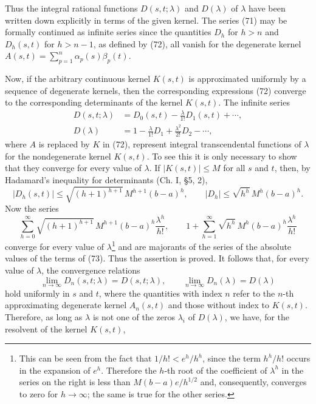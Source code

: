 Thus the integral rational functions $D(s,t;\lambda)$ and $D(\lambda)$ of $\lambda$ have been written down explicitly in terms of the given kernel. The series (71) may be formally continued as infinite series since the quantities $D_h$ for $h>n$ and $D_h(s,t)$ for $h>n-1$, as defined by (72), all vanish for the degenerate kernel $A(s,t)=\sum_{p=1}^{n}\alpha_p(s)\beta_p(t)$.

Now, if the arbitrary continuous kernel $K(s,t)$ is approximated uniformly by a sequence of degenerate kernels, then the corresponding expressions (72) converge to the corresponding determinants of the kernel $K(s,t)$. The infinite series
\begin{equation}\tag{73}
\begin{aligned}
D(s,t;\lambda)&=D_0(s,t)-\frac{\lambda}{1!}D_1(s,t)+\cdots,\\
D(\lambda)&=1-\frac{\lambda}{1!}D_1+\frac{\lambda^2}{2!}D_2-\cdots,
\end{aligned}
\end{equation}
where $A$ is replaced by $K$ in (72), represent integral transcendental functions of $\lambda$ for the nondegenerate kernel $K(s,t)$. To see this it is only necessary to show that they converge for every value of $\lambda$. If $|K(s,t)|\le M$ for all $s$ and $t$, then, by Hadamard's inequality for determinants (Ch. I, \S5, 2),
\[
|D_h(s,t)|\le \sqrt{(h+1)^{h+1}}\,M^{h+1}(b-a)^h,
\qquad
|D_h|\le \sqrt{h^h}\,M^h(b-a)^h.
\]
Now the series
\[
\sum_{h=0}^{\infty}\sqrt{(h+1)^{h+1}}\,M^{h+1}(b-a)^h\frac{\lambda^h}{h!},
\qquad
1+\sum_{h=1}^{\infty}\sqrt{h^h}\,M^h(b-a)^h\frac{\lambda^h}{h!}
\]
converge for every value of $\lambda$\footnote{This can be seen from the fact that $1/h!<e^h/h^h$, since the term $h^h/h!$ occurs in the expansion of $e^h$. Therefore the $h$-th root of the coefficient of $\lambda^h$ in the series on the right is less than $M(b-a)e/h^{1/2}$ and, consequently, converges to zero for $h\to\infty$; the same is true for the other series.} and are majorants of the series of the absolute values of the terms of (73). Thus the assertion is proved. It follows that, for every value of $\lambda$, the convergence relations
\[
\lim_{n\to\infty}D_n(s,t;\lambda)=D(s,t;\lambda),
\qquad
\lim_{n\to\infty}D_n(\lambda)=D(\lambda)
\]
hold uniformly in $s$ and $t$, where the quantities with index $n$ refer to the $n$-th approximating degenerate kernel $A_n(s,t)$ and those without index to $K(s,t)$. Therefore, as long as $\lambda$ is not one of the zeros $\lambda_i$ of $D(\lambda)$, we have, for the resolvent of the kernel $K(s,t)$,
